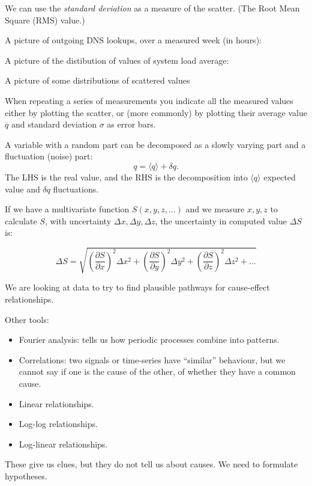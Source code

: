 \documentclass{slides}
\begin{document}
We can use the {\it standard deviation} as a measure of the scatter. (The Root Mean Square (RMS) value.)

\vspace{1cm}
A picture of outgoing DNS lookups, over a measured week (in hours):

\vspace{1cm}


\vspace{1cm}

A picture of the distibution of values of system load average:


A picture of some distributions of scattered values
\vspace{1cm}



When repeating a series of measurements you indicate all the measured values either by plotting
the scatter, or (more commonly) by plotting their average value $\overline q$ and standard deviation $\sigma$ as error bars.


A variable with a random part can be decomposed as a slowly varying part and a fluctuation (noise)
part:
$$
q = \langle q\rangle + \delta q.
$$
The LHS is the real value, and the RHS is the decomposition into $\langle q\rangle$
expected value and $\delta q$ fluctuations.



If we have a multivariate function $S(x,y,z,...)$ and we measure $x,y,z$ to calculate $S$,
with uncertainty $\Delta x,\Delta y, \Delta z$, the uncertainty in computed value $\Delta S$
is:

$$
\Delta S = \sqrt{\left(\frac{\partial S}{\partial x}\right)^2\Delta x^2
+\left(\frac{\partial S}{\partial y}\right)^2\Delta y^2
+\left(\frac{\partial S}{\partial z}\right)^2\Delta z^2
+\ldots
}
$$


We are looking at data to try to find plausible pathways for cause-effect relationships. 

Other tools:
\begin{itemize}
\item Fourier analysis: tells us how periodic processes combine into patterns.
\item Correlations: two signals or time-series have ``similar'' behaviour, but we
cannot say if one is the cause of the other, of whether they have a common cause.
\item Linear relationships.
\item Log-log relationships.
\item Log-linear relationships.
\end{itemize}
These give us clues, but they do not tell us about causes. We need to formulate
hypotheses.
\end{document}

